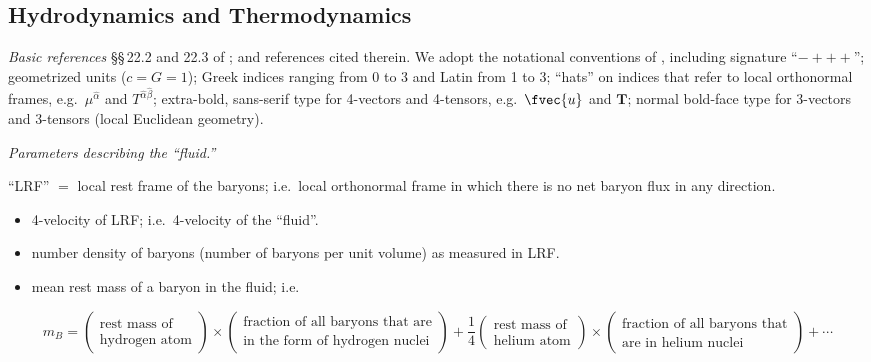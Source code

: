 
\subsection{Hydrodynamics and Thermodynamics}
\label{sec:2.5}

\textit{Basic references}\quad
\S\S\,22.2 and 22.3 of \citet{MTW1973};
\citet{Lichnerowicz1967} and references cited therein.
We adopt the notational conventions of \citet{MTW1973},
including signature ``$-+++$''; geometrized units ($c = G = 1$); Greek
indices ranging from 0 to 3 and Latin from 1 to 3; ``hats'' on indices that refer
to local orthonormal frames, e.g.\ $\mu^{\hat{\alpha}}$ and $T^{\hat{\alpha}\hat{\beta}}$; extra-bold, sans-serif type for
4-vectors and 4-tensors, e.g.\ $\fvec{u}$ and $\mathbf{T}$; normal bold-face type for 3-vectors and
3-tensors (local Euclidean geometry).

\medskip
\noindent
\textit{Parameters describing the ``fluid.''}

\medskip
\noindent
``LRF'' $=$ local rest frame of the baryons; i.e.\ local orthonormal frame in which
there is no net baryon flux in any direction.

\begin{itemize}
\item[$\fvec{u}$] 4-velocity of LRF; i.e.\ 4-velocity of the ``fluid''.
\item[$n$] number density of baryons (number of baryons per unit volume) as
measured in LRF.
\item[$m_B$] mean rest mass of a baryon in the fluid; i.e.
\end{itemize}
\begin{equation}
m_B = \left(\!\!
\begin{array}{c}
\text{rest mass of}\\
\text{hydrogen atom}
\end{array}\!\!\right)
\times
\left(\!\!
\begin{array}{c}
\text{fraction of all baryons that are}\\
\text{in the form of hydrogen nuclei}
\end{array}\!\!\right)
+
\frac{1}{4}
\left(\!\!
\begin{array}{c}
\text{rest mass of}\\
\text{helium atom}
\end{array}\!\!\right)
\times
\left(\!\!
\begin{array}{c}
\text{fraction of all baryons that}\\
\text{are in helium nuclei}
\end{array}\!\!\right)
+ \cdots
\tag{2.5.1}
\end{equation}

